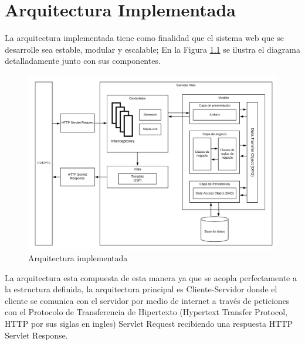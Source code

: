 \chapter{Arquitectura Implementada} \label{cap:seis}

La arquitectura implementada tiene como finalidad que el sistema web que se desarrolle sea estable, modular y escalable; En la Figura \ref{fig:arqui} se ilustra el diagrama  detalladamente junto con sus componentes.

\begin{figure}[H]
	\begin{center}
		\includegraphics[width=.75\textwidth]{images/arquitectura/DiagramaArquitecturaTesseract}
		\caption{Arquitectura implementada}
		\label{fig:arqui}
	\end{center}
\end{figure}

La arquitectura esta compuesta de esta manera ya que se acopla perfectamente a la estructura definida, la arquitectura principal es Cliente-Servidor donde el cliente se comunica con el servidor por medio de internet a través de peticiones con el Protocolo de Transferencia de Hipertexto (Hypertext Transfer Protocol, HTTP por sus siglas en ingles) Servlet Request recibiendo una respuesta HTTP Servlet Response.\\

